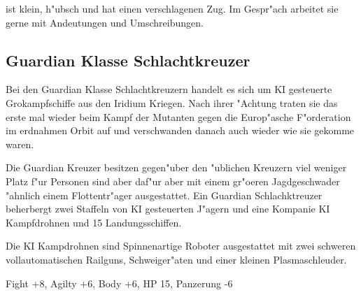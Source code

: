 \ml{} ist klein, h"ubsch und hat einen verschlagenen Zug. Im Gespr"ach arbeitet sie gerne mit Andeutungen und Umschreibungen.

\subsection{Guardian Klasse Schlachtkreuzer}

Bei den Guardian Klasse Schlachtkreuzern handelt es sich um KI gesteuerte Gro\3kampfschiffe aus den Iridium Kriegen. Nach ihrer "Achtung traten sie das erste mal wieder beim Kampf der Mutanten gegen die Europ"asche F"orderation im erdnahmen Orbit auf und verschwanden danach auch wieder wie sie gekomme waren.

Die Guardian Kreuzer besitzen gegen"uber den "ublichen Kreuzern viel weniger Platz f"ur Personen sind aber daf"ur aber mit einem gr"o\3eren Jagdgeschwader "ahnlich einem Flottentr"ager ausgestattet. Ein Guardian Schlachktreuzer beherbergt zwei Staffeln von KI gesteuerten J"agern und eine Kompanie KI Kampfdrohnen und 15 Landungsschiffen.

Die KI Kampdrohnen sind Spinnenartige Roboter ausgestattet mit zwei schweren vollautomatischen Railguns, Schwei\3ger"aten und einer kleinen Plasmaschleuder.

Fight +8, Agilty +6, Body +6, HP 15, Panzerung -6

